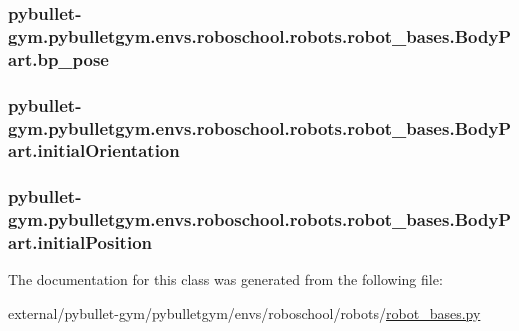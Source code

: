 \subsubsection[{\texorpdfstring{bp\+\_\+pose}{bp_pose}}]{\setlength{\rightskip}{0pt plus 5cm}pybullet-\/gym.\+pybulletgym.\+envs.\+roboschool.\+robots.\+robot\+\_\+bases.\+Body\+Part.\+bp\+\_\+pose}\hypertarget{classpybullet-gym_1_1pybulletgym_1_1envs_1_1roboschool_1_1robots_1_1robot__bases_1_1_body_part_a652bdd3e01626fed019d813cb87ec664}{}\label{classpybullet-gym_1_1pybulletgym_1_1envs_1_1roboschool_1_1robots_1_1robot__bases_1_1_body_part_a652bdd3e01626fed019d813cb87ec664}
\subsubsection[{\texorpdfstring{initial\+Orientation}{initialOrientation}}]{\setlength{\rightskip}{0pt plus 5cm}pybullet-\/gym.\+pybulletgym.\+envs.\+roboschool.\+robots.\+robot\+\_\+bases.\+Body\+Part.\+initial\+Orientation}\hypertarget{classpybullet-gym_1_1pybulletgym_1_1envs_1_1roboschool_1_1robots_1_1robot__bases_1_1_body_part_a9857ec9c9817ef5598fcb22a070ebaf4}{}\label{classpybullet-gym_1_1pybulletgym_1_1envs_1_1roboschool_1_1robots_1_1robot__bases_1_1_body_part_a9857ec9c9817ef5598fcb22a070ebaf4}
\subsubsection[{\texorpdfstring{initial\+Position}{initialPosition}}]{\setlength{\rightskip}{0pt plus 5cm}pybullet-\/gym.\+pybulletgym.\+envs.\+roboschool.\+robots.\+robot\+\_\+bases.\+Body\+Part.\+initial\+Position}\hypertarget{classpybullet-gym_1_1pybulletgym_1_1envs_1_1roboschool_1_1robots_1_1robot__bases_1_1_body_part_ac09fc874b2389c464cacd101582dac31}{}\label{classpybullet-gym_1_1pybulletgym_1_1envs_1_1roboschool_1_1robots_1_1robot__bases_1_1_body_part_ac09fc874b2389c464cacd101582dac31}


The documentation for this class was generated from the following file\+:\begin{DoxyCompactItemize}
\item 
external/pybullet-\/gym/pybulletgym/envs/roboschool/robots/\hyperlink{roboschool_2robots_2robot__bases_8py}{robot\+\_\+bases.\+py}\end{DoxyCompactItemize}

